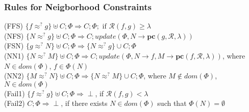 		
		\begin{frame}[fragile=singleslide]
	\frametitle{Rules for Neigborhood Constraints}
		\textcolor[rgb]{0.55,0,0}{(FFS)} $\{f \approx^? g\} \uplus C; \Phi \Rightarrow  C; \Phi; \text{ if } \mathcal{R}(f,g)\geq \lambda$ \\
		\vspace{0.3cm}
		\textcolor[rgb]{0.55,0,0}{(NFS)} $\{N \approx^? g\} \uplus C; \Phi \Rightarrow  C; update(\Phi,N\rightarrow \textbf{pc}(g,\mathcal{R},\lambda))$  \\
		\vspace{0.3cm}
		\textcolor[rgb]{0.55,0,0}{(FSN)} $\{g \approx^? N\} \uplus C; \Phi \Rightarrow  \{N \approx^? g\} \cup C;\Phi$  \\
		\vspace{0.3cm}
		\textcolor[rgb]{0.55,0,0}{(NN1)} $\{N \approx^? M\} \uplus C; \Phi \Rightarrow  C; update(\Phi,N\rightarrow {f}, M\rightarrow \textbf{pc}(f,\mathcal{R},\lambda))$, where $N \in dom(\Phi )$, $f\in \Phi(N)$ \\
		\vspace{0.3cm}
		\textcolor[rgb]{0.55,0,0}{(NN2)} $\{M \approx^? N\} \uplus C; \Phi \Rightarrow  \{N \approx^? M\} \cup C;\Phi$, where $M \notin dom(\Phi )$, $N\in dom(\Phi)$ \\
		\vspace{0.3cm}
		\textcolor[rgb]{0.55,0,0}{(Fail1)} $\{f \approx^? g\} \uplus C; \Phi \Rightarrow  \perp$, if $\mathcal{R}(f,g) < \lambda$ \\
		\vspace{0.3cm}
		\textcolor[rgb]{0.55,0,0}{(Fail2)} $C; \Phi \Rightarrow  \perp$, if there exists $N \in dom(\Phi )$ such that $\Phi (N)=\emptyset$ \\
		\vspace{0.3cm}
	
  \end{frame}	
	
		
